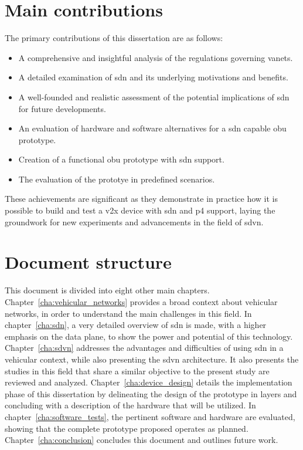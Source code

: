 
\section{Main contributions} %
\label{sec:main_contributions}

The primary contributions of this dissertation are as follows:
\begin{itemize}
    \item A comprehensive and insightful analysis of the regulations governing \glspl{vanet}.
    \item A detailed examination of \gls{sdn} and its underlying motivations and benefits.
    \item A well-founded and realistic assessment of the potential implications of \gls{sdn} for future developments.
    \item An evaluation of hardware and software alternatives for a \gls{sdn} capable \gls{obu} prototype.
    \item Creation of a functional \gls{obu} prototype with \gls{sdn} support.
    \item The evaluation of the prototye in predefined scenarios.

\end{itemize}
These achievements are significant as they demonstrate in practice how it is possible to build and test a \gls{v2x} device with \gls{sdn} and \gls{p4} support, laying the groundwork for new experiments and advancements in the field of \gls{sdvn}.


\section{Document structure} %
\label{sec:document_structure}

This document is divided into eight other main chapters. Chapter~\ref{cha:vehicular_networks} provides a broad context about vehicular networks, in order to understand the main challenges in this field. In chapter~\ref{cha:sdn}, a very detailed overview of \gls{sdn} is made, with a higher emphasis on the data plane, to show the power and potential of this technology. Chapter~\ref{cha:sdvn} addresses the advantages and difficulties of using \gls{sdn} in a vehicular context, while also presenting the \gls{sdvn} architecture. It also presents the studies in this field that share a similar objective to the present study are reviewed and analyzed. Chapter~\ref{cha:device_design} details the implementation phase of this dissertation by delineating the design of the prototype in layers and concluding with a description of the hardware that will be utilized. In chapter~\ref{cha:software_tests}, the pertinent software and hardware are evaluated, showing that the complete prototype proposed operates as planned. Chapter~\ref{cha:conclusion} concludes this document and outlines future work.



